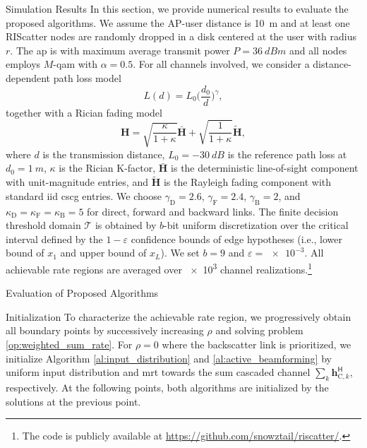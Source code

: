 \documentclass[journal]{IEEEtran}
\begin{document}
\begin{section}{Simulation Results}
	\label{sc:simulation_results}
	In this section, we provide numerical results to evaluate the proposed algorithms.
	We assume the AP-user distance is \qty{10}{m} and at least one RIScatter nodes are randomly dropped in a disk centered at the user with radius $r$.
	The \gls{ap} is with maximum average transmit power $P=\qty{36}{dBm}$ and all nodes employs $M$-\gls{qam} with $\alpha=0.5$.
	For all channels involved, we consider a distance-dependent path loss model
	\begin{equation}
		L(d) = L_0 \biggl(\frac{d_0}{d}\biggr)^\gamma,
	\end{equation}
	together with a Rician fading model
	\begin{equation}
		\boldsymbol{H} = \sqrt{\frac{\kappa}{1+\kappa}} \bar{\boldsymbol{H}} + \sqrt{\frac{1}{1+\kappa}} \tilde{\boldsymbol{H}},
	\end{equation}
	where $d$ is the transmission distance, $L_0=-\qty{30}{dB}$ is the reference path loss at $d_0=\qty{1}{m}$, $\kappa$ is the Rician K-factor, $\bar{\boldsymbol{H}}$ is the deterministic line-of-sight component with unit-magnitude entries, and $\tilde{\boldsymbol{H}}$ is the Rayleigh fading component with standard \gls{iid} \gls{cscg} entries.
	We choose $\gamma_{\text{D}}=2.6$, $\gamma_{\text{F}}=2.4$, $\gamma_{\text{B}}=2$, and $\kappa_{\text{D}}=\kappa_{\text{F}}=\kappa_{\text{B}}=5$ for direct, forward and backward links.
	The finite decision threshold domain $\mathcal{T}$ is obtained by $b$-bit uniform discretization over the critical interval defined by the $1-\varepsilon$ confidence bounds of edge hypotheses (i.e., lower bound of $x_1$ and upper bound of $x_L$).
	We set $b=9$ and $\varepsilon=\num{e-3}$.
	All achievable rate regions are averaged over \num{e3} channel realizations.\footnote{The code is publicly available at \url{https://github.com/snowztail/riscatter/}.}

	\begin{subsection}{Evaluation of Proposed Algorithms}
		\begin{subsubsection}{Initialization}
			To characterize the achievable rate region, we progressively obtain all boundary points by successively increasing $\rho$ and solving problem \eqref{op:weighted_sum_rate}.
			For $\rho=0$ where the backscatter link is prioritized, we initialize Algorithm \ref{al:input_distribution} and \ref{al:active_beamforming} by uniform input distribution and \gls{mrt} towards the sum cascaded channel $\sum_{k} \boldsymbol{h}_{\text{C},k}^\mathsf{H}$, respectively.
			At the following points, both algorithms are initialized by the solutions at the previous point.
		\end{subsubsection}


\end{subsection}
\end{section}
\end{document}
